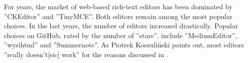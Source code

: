 For years, the market of web-based rich-text editors has been dominated by ''CKEditor'' and ''TinyMCE''. Both editors remain among the most popular choices. In the last years, the number of editors increased drastically. Popular choices on GitHub, rated by the number of ''stars'', include ''MediumEditor'', ''wysihtml'' and ''Summernote''. As Piotrek Koszuli\'{n}ski points out, most editors ''really doesn't[sic] work''\cite{bj} for the reasons discussed in .

